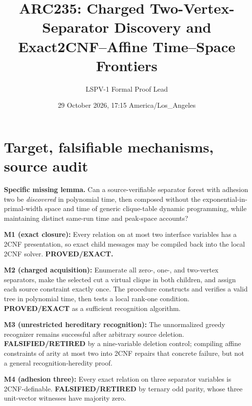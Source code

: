 \documentclass[10pt]{article}
\title{ARC235: Charged Two-Vertex-Separator Discovery and Exact\newline 2CNF--Affine Time--Space Frontiers}
\author{LSPV-1 Formal Proof Lead}
\date{29 October 2026, 17:15 America/Los\_Angeles}
\begin{document}
\maketitle
\begin{center}\end{center}

\section{Target, falsifiable mechanisms, source audit}
\noindent\textbf{Specific missing lemma.} Can a source-verifiable separator forest with adhesion two be \emph{discovered} in polynomial time, then composed without the exponential-in-primal-width space and time of generic clique-table dynamic programming, while maintaining distinct same-run time and peak-space accounts?

\noindent\textbf{M1 (exact closure):} Every relation on at most two interface variables has a 2CNF presentation, so exact child messages may be compiled back into the local 2CNF solver. \textbf{PROVED/EXACT.}
\par\noindent\textbf{M2 (charged acquisition):} Enumerate all zero-, one-, and two-vertex separators, make the selected cut a virtual clique in both children, and assign each source constraint exactly once. The procedure constructs and verifies a valid tree in polynomial time, then tests a local rank-one condition. \textbf{PROVED/EXACT} as a sufficient recognition algorithm.
\par\noindent\textbf{M3 (unrestricted hereditary recognition):} The unnormalized greedy recognizer remains successful after arbitrary source deletion. \textbf{FALSIFIED/RETIRED} by a nine-variable deletion control; compiling affine constraints of arity at most two into 2CNF repairs that concrete failure, but not a general recognition-heredity proof.
\par\noindent\textbf{M4 (adhesion three):} Every exact relation on three separator variables is 2CNF-definable. \textbf{FALSIFIED/RETIRED} by ternary odd parity, whose three unit-vector witnesses have majority zero.
\end{document}

